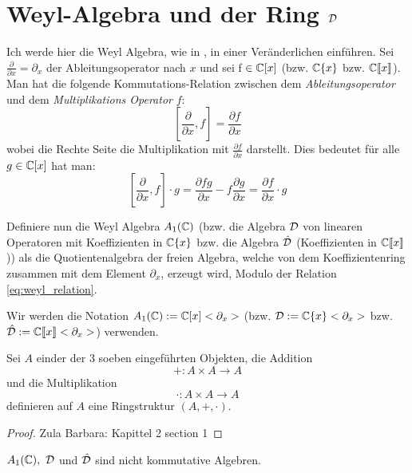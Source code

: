 \section{Weyl-Algebra und der Ring ${\mathcal{D}}$} %
Ich werde hier die Weyl Algebra, wie in
\cite[Chapter~1]{sabbah_cimpa90}, in einer Veränderlichen einführen.
Sei $\frac{\partial}{\partial x}=\partial_x$ der Ableitungsoperator nach $x$
und sei f $\in{\mathbb C}[x]$ (bzw. ${\mathbb C}\{x\}$ bzw. ${\mathbb C}\llbracket x\rrbracket$).
Man hat die folgende Kommutations-Relation zwischen dem
\emph{Ableitungsoperator}
und dem \emph{Multiplikations Operator} $f$:
\begin{equation}\label{eq:weyl_relation}
  [\frac{\partial}{\partial x},f]=\frac{\partial f}{\partial x}
\end{equation}
wobei die Rechte Seite die Multiplikation mit $\frac{\partial f}{\partial x}$
darstellt. Dies bedeutet für alle $g\in{\mathbb C}[x]$ hat man:
\[
  [\frac{\partial}{\partial x},f]\cdot g
  =\frac{\partial fg}{\partial x} - f\frac{\partial g}{\partial x}
  =\frac{\partial f}{\partial x} \cdot g
\]
\begin{defn}
  Definiere nun die Weyl Algebra $A_1({\mathbb C})$ (bzw. die Algebra ${\mathcal{D}}$ von
  linearen Operatoren mit Koeffizienten in ${\mathbb C}\{x\}$ bzw. die Algebra
  $\hat{{\mathcal{D}}}$ (Koeffizienten in ${\mathbb C}\llbracket x\rrbracket$)) als die
  Quotientenalgebra der freien Algebra, welche von dem Koeffizientenring
  zusammen mit dem Element $\partial_x$, erzeugt wird, Modulo der Relation
  \eqref{eq:weyl_relation}.
\end{defn}
Wir werden die Notation $A_1({\mathbb C}):={\mathbb C}[x]<\partial_x>$ (bzw.
${\mathcal{D}}:={\mathbb C}\{x\}<\partial_x>$ bzw. 
$\hat{{\mathcal{D}}}:={\mathbb C}\llbracket x\rrbracket<\partial_x>$) verwenden.

\begin{lem} %
  Sei $A$ einder der 3 soeben eingeführten Objekten, die Addition 
  \[
    +:A\times A \rightarrow A
  \]
  und die Multiplikation
  \[
    \cdot:A\times A \rightarrow A
  \]
  definieren auf $A$ eine Ringstruktur $(A,+,\cdot)$.
\end{lem}
\begin{proof}
  Zula Barbara: Kapittel 2 section 1
\end{proof}

\begin{rem}
  $A_1({\mathbb C}),~{\mathcal{D}}$ und $\hat{{\mathcal{D}}}$ sind nicht kommutative Algebren.
\end{rem}

